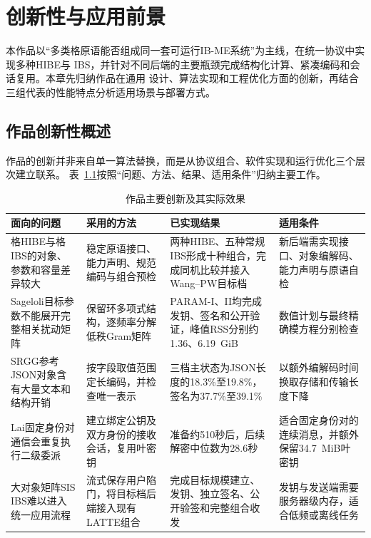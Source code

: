 \chapter{创新性与应用前景}

本作品以“多类格原语能否组成同一套可运行IB-ME系统”为主线，在统一协议中实现多种HIBE与
IBS，并针对不同后端的主要瓶颈完成结构化计算、紧凑编码和会话复用。本章先归纳作品在通用
设计、算法实现和工程优化方面的创新，再结合三组代表的性能特点分析适用场景与部署方式。

\section{作品创新性概述}

作品的创新并非来自单一算法替换，而是从协议组合、软件实现和运行优化三个层次建立联系。
表~\ref{tab:innovation-summary}按照“问题、方法、结果、适用条件”归纳主要工作。

\begin{table}[H]
\centering\small
\caption{作品主要创新及其实际效果}
\label{tab:innovation-summary}
\begin{tabularx}{\textwidth}{@{}>{\raggedright\arraybackslash}p{}>{\raggedright\arraybackslash}p{}>{\raggedright\arraybackslash}p{}>{\raggedright\arraybackslash}X@{}}
\toprule
\rowcolor{black!8} 面向的问题 & 采用的方法 & 已实现结果 & 适用条件 \\
\midrule
格HIBE与格IBS的对象、参数和容量差异较大
& 稳定原语接口、能力声明、规范编码与组合预检
& 两种HIBE、五种常规IBS形成十种组合，完成同机比较并接入Wang--PW目标档
& 新后端需实现接口、对象编解码、能力声明与原语自检 \\

Sageloli目标参数不能展开完整相关扰动矩阵
& 保留环多项式结构，逐频率分解低秩Gram矩阵
& PARAM-I、II均完成发钥、签名和公开验证，峰值RSS分别约1.36、6.19~GiB
& 数值计划与最终精确模方程分别检查 \\

SRGG参考JSON对象含有大量文本和结构开销
& 按字段取值范围定长编码，并检查唯一表示
& 三档主状态为JSON长度的18.3\%至19.8\%，签名为37.7\%至39.1\%
& 以额外编解码时间换取存储和传输长度下降 \\

Lai固定身份对通信会重复执行二级委派
& 建立绑定公钥及双方身份的接收会话，复用叶密钥
& 准备约510秒后，后续解密中位数为28.6秒
& 适合固定身份对的连续消息，并额外保留34.7~MiB叶密钥 \\

大对象矩阵SIS IBS难以进入统一应用流程
& 流式保存用户陷门，将目标档后端接入现有LATTE组合
& 完成目标规模建立、发钥、独立签名、公开验签和完整组合收发
& 发钥与发送端需要服务器级内存，适合低频或离线任务 \\
\bottomrule
\end{tabularx}
\end{table}

